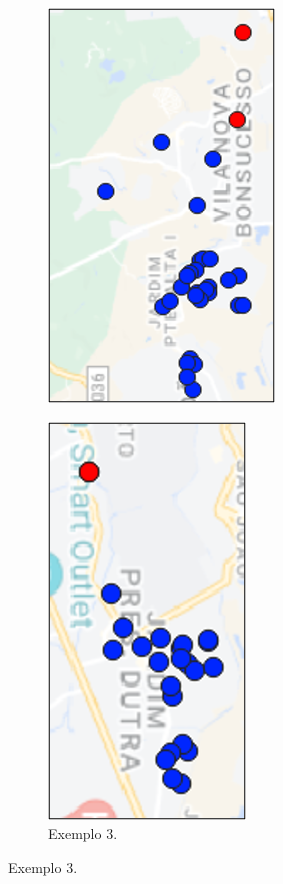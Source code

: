 \begin{figure}[H]
\begin{subfigure}{.3\textwidth}
       \includegraphics[height=1.2\textwidth]{images/4_materiais/compactacao/CompactacaoExemplo2.png}
       \label{fig:AMBEV_Compac_2}
     \end{subfigure}
     \begin{subfigure}{.3\textwidth}
       \centering
       \caption{Exemplo 3.}
       \includegraphics[height=1.2\textwidth]{images/4_materiais/compactacao/CompactacaoExemplo3.png}

\end{subfigure}
\end{figure}
